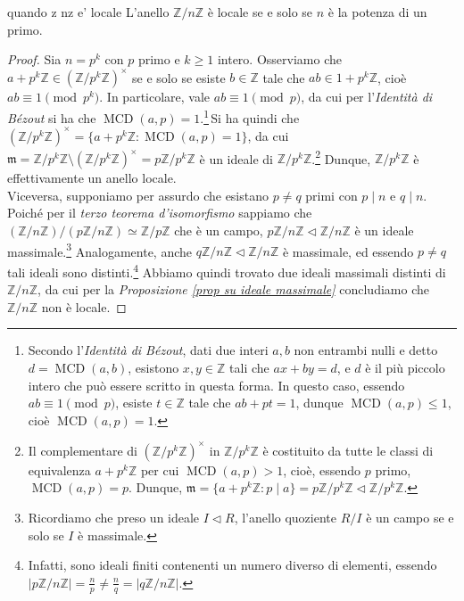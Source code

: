 \begin{prop}[1.7.9]{quando z nz e' locale}
  L'anello $\mathbb{Z}/n\mathbb{Z}$ è locale se e solo se $n$ è la potenza di un primo.
\end{prop}
\vspace{-4mm}
\begin{proof}
  Sia $n=p^k$ con $p$ primo e $k\geq 1$ intero. Osserviamo che $a+p^k\mathbb{Z}\in (\mathbb{Z}/p^k\mathbb{Z})^{\times}$ se e solo se esiste 
  $b\in \mathbb{Z}$ tale che $ab\in 1+p^k\mathbb{Z}$, cioè $ab\equiv 1 \pmod{p^k}$. In particolare, vale $ab\equiv 1\pmod{p}$, 
  da cui per l'\emph{Identità di Bézout} si ha che $\operatorname{MCD}(a,p)=1$.\footnote{Secondo l'\emph{Identità di Bézout}, 
  dati due interi $a,b$ non entrambi nulli e detto $d=\operatorname{MCD}(a,b)$, esistono $x,y\in \mathbb{Z}$ tali che $ax+by=d$, 
  e $d$ è il più piccolo intero che può essere scritto in questa forma. In questo caso, essendo $ab\equiv 1\pmod{p}$, 
  esiste $t\in \mathbb{Z}$ tale che $ab+pt=1$, dunque $\operatorname{MCD}(a,p)\leq 1$, cioè $\operatorname{MCD}(a,p)=1$.}\,Si ha quindi che 
  $(\mathbb{Z}/p^k\mathbb{Z})^{\times}=\{a+p^k\mathbb{Z}: \operatorname{MCD}(a,p)=1\}$, da cui 
  $\mathfrak{m}=\mathbb{Z}/p^k\mathbb{Z}\setminus (\mathbb{Z}/p^k\mathbb{Z})^{\times}=p\mathbb{Z}/p^k\mathbb{Z}$ 
  è un ideale di $\mathbb{Z}/p^k\mathbb{Z}$.\footnote{Il complementare di $(\mathbb{Z}/p^k\mathbb{Z})^{\times}$ in $\mathbb{Z}/p^k\mathbb{Z}$ 
  è costituito da tutte le classi di equivalenza $a+p^k\mathbb{Z}$ per cui $\operatorname{MCD}(a,p)>1$, cioè, essendo $p$ primo, 
  $\operatorname{MCD}(a,p)=p$. Dunque, $\mathfrak{m}=\{a+p^k\mathbb{Z}: p\mid a\}=p\mathbb{Z}/p^k\mathbb{Z}\lhd \mathbb{Z}/p^k\mathbb{Z}$.} 
  Dunque, $\mathbb{Z}/p^k\mathbb{Z}$ è effettivamente un anello locale.\\

  \noindent Viceversa, supponiamo per assurdo che esistano $p\neq q$ primi con $p\mid n$ e $q \mid n$. Poiché per il \emph{terzo teorema d'isomorfismo} 
  sappiamo che $(\mathbb{Z}/n\mathbb{Z})/(p\mathbb{Z}/n\mathbb{Z})\simeq \mathbb{Z}/p\mathbb{Z}$ che è un campo, 
  $p\mathbb{Z}/n\mathbb{Z}\lhd \mathbb{Z}/n\mathbb{Z}$ è un ideale massimale.\footnote{Ricordiamo che preso un ideale $I\lhd R$, 
  l'anello quoziente $R/I$ è un campo se e solo se $I$ è massimale.} Analogamente, anche $q\mathbb{Z}/n\mathbb{Z}\lhd \mathbb{Z}/n\mathbb{Z}$ è massimale, 
  ed essendo $p\neq q$ tali ideali sono distinti.\footnote{Infatti, sono ideali finiti contenenti un numero diverso di elementi, 
  essendo $|p\mathbb{Z}/n\mathbb{Z}|=\frac{n}{p}\neq \frac{n}{q}=|q\mathbb{Z}/n\mathbb{Z}|$.} 
  Abbiamo quindi trovato due ideali massimali distinti di $\mathbb{Z}/n\mathbb{Z}$, da cui per la \emph{Proposizione \ref{prop su ideale massimale}} 
  concludiamo che $\mathbb{Z}/n\mathbb{Z}$ non è locale.
\end{proof}

